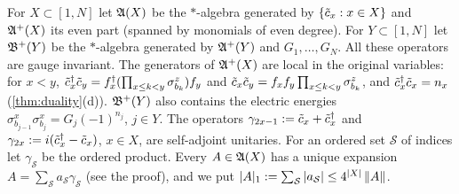 For $X\subset[1,N]$ let $\mathfrak{A}(X)$ be the $*$-algebra generated by $\{\tilde c_x:x\in X\}$ and $\mathfrak{A}^+(X)$ its even
part (spanned by monomials of even degree).  For $Y\subset[1,N]$ let $\mathfrak{B}^+(Y)$ be the $*$-algebra generated by
$\mathfrak{A}^+(Y)$ and $G_1,\dots,G_N$.  All these operators are gauge invariant.  The generators of $\mathfrak{A}^+(X)$ are local
in the original variables: for $x<y$, $\tilde c_x^\dagger\tilde c_y=f_x^\dagger(\prod_{x\le k<y}\sigma^z_{b_k})f_y$ and
$\tilde c_x\tilde c_y=f_xf_y\prod_{x\le k<y}\sigma^z_{b_k}$, and $\tilde c_x^\dagger\tilde c_x=n_x$ (\cref{thm:duality}(d)).
$\mathfrak{B}^+(Y)$ also contains the electric energies $\sigma^x_{b_{j-1}}\sigma^x_{b_j}=G_j(-1)^{n_j}$, $j\in Y$.  The
operators $\gamma_{2x-1}:=\tilde c_x+\tilde c_x^\dagger$ and $\gamma_{2x}:=i(\tilde c_x^\dagger-\tilde c_x)$, $x\in X$, are self-adjoint
unitaries.  For an ordered set $\mathcal S$ of indices let $\gamma_{\mathcal S}$ be the ordered product.  Every
$A\in\mathfrak{A}(X)$ has a unique expansion $A=\sum_{\mathcal S}a_{\mathcal S}\gamma_{\mathcal S}$ (see the proof), and we
put $|A|_1:=\sum_{\mathcal S}|a_{\mathcal S}|\le4^{|X|}\left\|A\right\|$.


